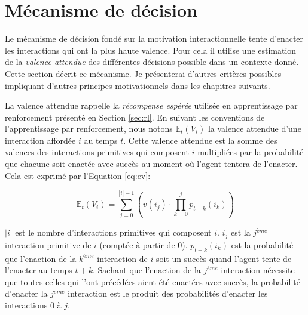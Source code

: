 \section{Mécanisme de décision}

\noindent
Le mécanisme de décision fondé sur la motivation interactionnelle tente d'enacter les interactions qui ont la plus haute valence.
Pour cela il utilise une estimation de la \emph{valence attendue} des différentes décisions possible dans un contexte donné.
Cette section décrit ce mécanisme. 
Je présenterai d'autres critères possibles impliquant d'autres principes motivationnels dans les chapitres suivants. 

La valence attendue rappelle la \emph{récompense espérée} utilisée en apprentissage par renforcement présenté en Section \ref{sec:rl}. 
En suivant les conventions de l'apprentissage par renforcement, nous notons $\mathbb{E}_t(V_i)$ la valence attendue d'une interaction affordée $i$ au temps $t$. 
Cette valence attendue est la somme des valences des interactions primitives qui composent $i$ multipliées par la probabilité que chacune soit enactée avec succès au moment où l'agent tentera de l'enacter. 
Cela est exprimé par l'Equation \eqref{eq:ev}:


\begin{equation}\label{eq:ev}
	\mathbb{E}_t(V_i) = \sum_{j=0}^{|i|-1} ( v(i_j) \cdot \prod_{k=0}^{j} p_{t+k}(i_k) )
\end{equation}

$|i|$ est le nombre d'interactions primitives qui composent $i$. 
$i_j$ est la $j^{ème}$ interaction primitive de $i$ (comptée à partir de 0).
$p_{t+k}(i_k)$ est la probabilité que l'enaction de la $k^{ème}$ interaction de $i$ soit un succès quand l'agent tente de l'enacter au temps $t+k$.
Sachant que l'enaction de la $j^{ème}$ interaction nécessite que toutes celles qui l'ont précédées aient été enactées avec succès, la probabilité d'enacter la $j^{eme}$ interaction est le produit des probabilités d'enacter les interactions 0 à $j$.

